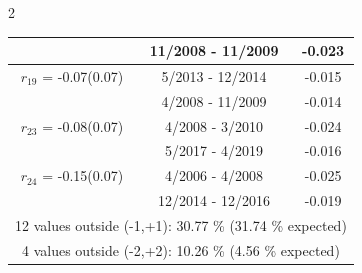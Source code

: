\begin{multicols}{2}
{\begin{tabular}{ccc}
  &       11/2008 - 11/2009 &       -0.023  \vspace{-.02in}   \\ \hline 
    $r_{19}$ = -0.07(0.07) &       5/2013 - 12/2014 &       -0.015    \vspace{-.10in} \\ 
  &        4/2008 - 11/2009 &       -0.014  \vspace{-.02in}   \\ \hline 
    $r_{23}$ = -0.08(0.07) &       4/2008 -  3/2010 &       -0.024    \vspace{-.10in} \\ 
  &        5/2017 -  4/2019 &       -0.016  \vspace{-.02in}   \\ \hline 
    $r_{24}$ = -0.15(0.07) &       4/2006 -  4/2008 &       -0.025    \vspace{-.10in} \\ 
  &       12/2014 - 12/2016 &       -0.019  \vspace{-.02in}   \\ \hline 
  \multicolumn{3}{c}{              12 values outside (-1,+1): 30.77  \% (31.74  \% expected)}\vspace{-.10in} \\ 
\multicolumn{3}{c}{               4 values outside (-2,+2): 10.26 \%  (4.56 \% expected) } \\
 \end{tabular} \\ 
 } 
\end{multicols} 
